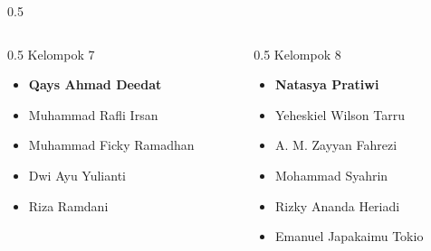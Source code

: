 \documentclass[../main.tex]{subfiles}
\begin{document}
\begin{frame}[mytitle=standard,t,mycolor=digiPH_gray,light]
\begin{columns}
\begin{column}{0.5\textwidth}
		\end{column}
	\end{columns}
\end{frame}


\begin{frame}[mytitle=standard,t,mycolor=digiPH_ocean,dark]
	\begin{columns}
		\begin{column}{0.5\textwidth}
			Kelompok 7
			\begin{itemize}
				\item \textbf{Qays Ahmad Deedat}
				\item Muhammad Rafli Irsan
				\item Muhammad Ficky Ramadhan
				\item Dwi Ayu Yulianti
				\item Riza Ramdani
			\end{itemize}
		\end{column}
		\begin{column}{0.5\textwidth}
			Kelompok 8
			\begin{itemize}
				\item \textbf{Natasya Pratiwi}
				\item Yeheskiel Wilson Tarru
				\item A. M. Zayyan Fahrezi
				\item Mohammad Syahrin
				\item Rizky Ananda Heriadi
				\item Emanuel Japakaimu Tokio
			\end{itemize}
		\end{column}
	\end{columns}


\end{frame}
\end{document}
